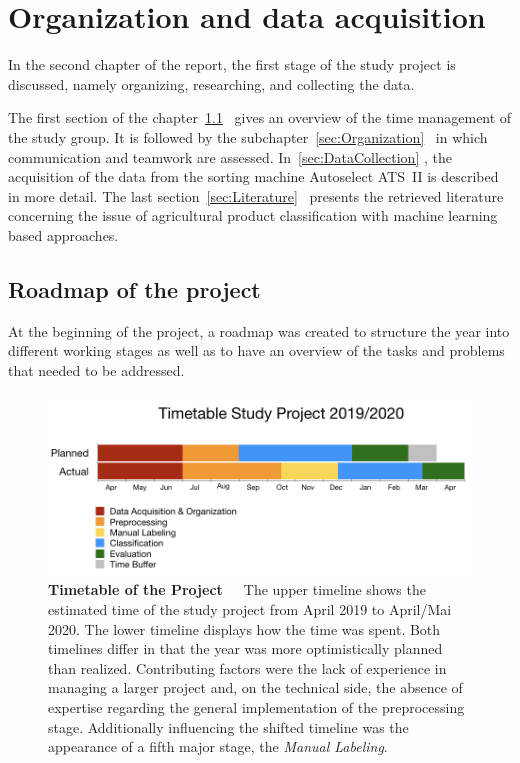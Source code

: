 
\section{Organization and data acquisition}
\label{ch:DataAcquisition}

In the second chapter of the report, the first stage of the study project is discussed, namely organizing, researching, and collecting the data.

The first section of the chapter~\ref{sec:Roadmap}~ gives an overview of the time management of the study group. It is followed by the subchapter~\ref{sec:Organization}~ in which communication and teamwork are assessed. In~\ref{sec:DataCollection} , the acquisition of the data from the sorting machine Autoselect ATS~II is described in more detail. The last section~\ref{sec:Literature}~ presents the retrieved literature concerning the issue of agricultural product classification with machine learning based approaches.

\subsection{Roadmap of the project}
\label{sec:Roadmap}

At the beginning of the project, a roadmap was created to structure the year into different working stages as well as to have an overview of the tasks and problems that needed to be addressed.

\begin{figure}[h]
	\centering
	\includegraphics[scale=0.43]{Figures/chapter02/new_timetable.png}
	\decoRule
	\caption[Timetable of the Project]{\textbf{Timetable of the Project}~~~The upper timeline shows the estimated time of the study project from April 2019 to April/Mai 2020. The lower timeline displays how the time was spent. Both timelines differ in that the year was more optimistically planned than realized. Contributing factors were the lack of experience in managing a larger project and, on the technical side, the absence of expertise regarding the general implementation of the preprocessing stage. Additionally influencing the shifted timeline was the appearance of a fifth major stage, the \emph{Manual Labeling}.}
	\label{fig:Timetable}
\end{figure}

